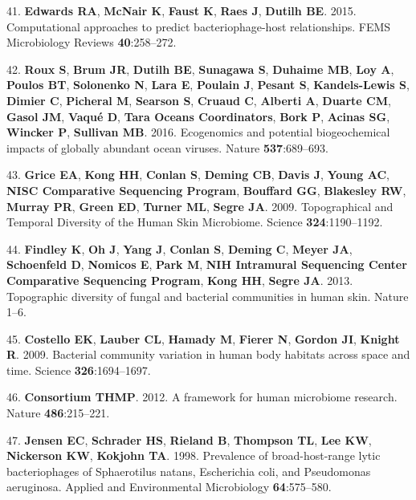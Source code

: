 \documentclass[12pt,]{article}
\begin{document}
\hypertarget{ref-Edwards:2015iz}{}
41. \textbf{Edwards RA}, \textbf{McNair K}, \textbf{Faust K},
\textbf{Raes J}, \textbf{Dutilh BE}. 2015. Computational approaches to
predict bacteriophage-host relationships. FEMS Microbiology Reviews
\textbf{40}:258--272.

\hypertarget{ref-Roux:2016cc}{}
42. \textbf{Roux S}, \textbf{Brum JR}, \textbf{Dutilh BE},
\textbf{Sunagawa S}, \textbf{Duhaime MB}, \textbf{Loy A}, \textbf{Poulos
BT}, \textbf{Solonenko N}, \textbf{Lara E}, \textbf{Poulain J},
\textbf{Pesant S}, \textbf{Kandels-Lewis S}, \textbf{Dimier C},
\textbf{Picheral M}, \textbf{Searson S}, \textbf{Cruaud C},
\textbf{Alberti A}, \textbf{Duarte CM}, \textbf{Gasol JM}, \textbf{Vaqué
D}, \textbf{Tara Oceans Coordinators}, \textbf{Bork P}, \textbf{Acinas
SG}, \textbf{Wincker P}, \textbf{Sullivan MB}. 2016. Ecogenomics and
potential biogeochemical impacts of globally abundant ocean viruses.
Nature \textbf{537}:689--693.

\hypertarget{ref-Grice:2009eea}{}
43. \textbf{Grice EA}, \textbf{Kong HH}, \textbf{Conlan S},
\textbf{Deming CB}, \textbf{Davis J}, \textbf{Young AC}, \textbf{NISC
Comparative Sequencing Program}, \textbf{Bouffard GG}, \textbf{Blakesley
RW}, \textbf{Murray PR}, \textbf{Green ED}, \textbf{Turner ML},
\textbf{Segre JA}. 2009. Topographical and Temporal Diversity of the
Human Skin Microbiome. Science \textbf{324}:1190--1192.

\hypertarget{ref-Findley:2013jf}{}
44. \textbf{Findley K}, \textbf{Oh J}, \textbf{Yang J}, \textbf{Conlan
S}, \textbf{Deming C}, \textbf{Meyer JA}, \textbf{Schoenfeld D},
\textbf{Nomicos E}, \textbf{Park M}, \textbf{NIH Intramural Sequencing
Center Comparative Sequencing Program}, \textbf{Kong HH}, \textbf{Segre
JA}. 2013. Topographic diversity of fungal and bacterial communities in
human skin. Nature 1--6.

\hypertarget{ref-Costello:2009im}{}
45. \textbf{Costello EK}, \textbf{Lauber CL}, \textbf{Hamady M},
\textbf{Fierer N}, \textbf{Gordon JI}, \textbf{Knight R}. 2009.
Bacterial community variation in human body habitats across space and
time. Science \textbf{326}:1694--1697.

\hypertarget{ref-Consortium:2012iz}{}
46. \textbf{Consortium THMP}. 2012. A framework for human microbiome
research. Nature \textbf{486}:215--221.

\hypertarget{ref-Jensen:1998vh}{}
47. \textbf{Jensen EC}, \textbf{Schrader HS}, \textbf{Rieland B},
\textbf{Thompson TL}, \textbf{Lee KW}, \textbf{Nickerson KW},
\textbf{Kokjohn TA}. 1998. Prevalence of broad-host-range lytic
bacteriophages of Sphaerotilus natans, Escherichia coli, and Pseudomonas
aeruginosa. Applied and Environmental Microbiology \textbf{64}:575--580.
\end{document}
